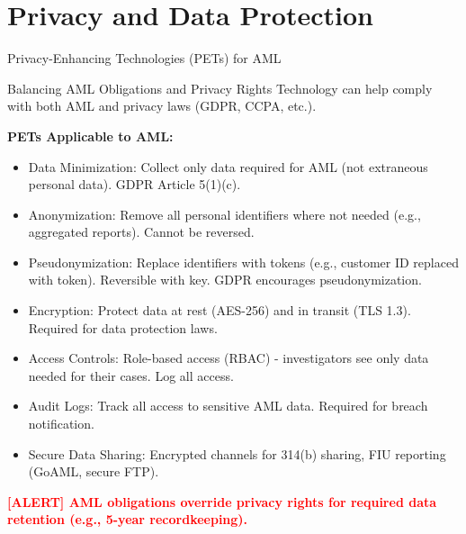\documentclass[11pt,a4paper]{beamer}
\newcommand{\redflag}[1]{\textcolor{red}{\textbf{[ALERT] #1}}}
\begin{document}
	\section{Privacy and Data Protection}
	
	\begin{frame}{Privacy-Enhancing Technologies (PETs) for AML}
		\begin{block}{Balancing AML Obligations and Privacy Rights}
			Technology can help comply with both AML and privacy laws (GDPR, CCPA, etc.).
		\end{block}
		
		\textbf{PETs Applicable to AML:}
		\begin{itemize}
			\item Data Minimization: Collect only data required for AML (not extraneous personal data). GDPR Article 5(1)(c).
			\item Anonymization: Remove all personal identifiers where not needed (e.g., aggregated reports). Cannot be reversed.
			\item Pseudonymization: Replace identifiers with tokens (e.g., customer ID replaced with token). Reversible with key. GDPR encourages pseudonymization.
			\item Encryption: Protect data at rest (AES-256) and in transit (TLS 1.3). Required for data protection laws.
			\item Access Controls: Role-based access (RBAC) - investigators see only data needed for their cases. Log all access.
			\item Audit Logs: Track all access to sensitive AML data. Required for breach notification.
			\item Secure Data Sharing: Encrypted channels for 314(b) sharing, FIU reporting (GoAML, secure FTP).
		\end{itemize}
		
		\redflag{AML obligations override privacy rights for required data retention (e.g., 5-year recordkeeping).}
	\end{frame}
	
\end{document}
